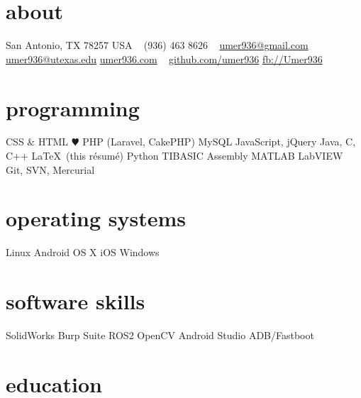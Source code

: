 \documentclass[]{friggeri-cv} %
\begin{document}


\begin{aside} %
	\section{about}
	San Antonio, TX 78257
	USA
	~
	(936) 463 8626
	~
	\href{mailto:umer936@gmail.com}{umer936@gmail.com}
	\href{mailto:umer936@utexas.edu}{umer936@utexas.edu}
	\href{http://umer936.com}{umer936.com}
	~
	\href{http://github.com/umer936}{github.com/umer936}
	\href{http://facebook.com/Umer936}{fb://Umer936}
	~
	\section{programming}
	CSS \& HTML
	{\color{red} $\varheartsuit$} PHP (Laravel, CakePHP)
	MySQL
	JavaScript, jQuery
	Java, C, C++
	\LaTeX \ (this r\'esum\'e)
	Python
	TIBASIC
	Assembly
	MATLAB
	LabVIEW
	Git, SVN, Mercurial
	~
	\section{operating systems}
	Linux
	Android
	OS X
	iOS
	Windows
	~
	\section{software skills}
	SolidWorks
	Burp Suite
	ROS2
	OpenCV
	Android Studio
	ADB/Fastboot
\end{aside}


\section{education}
\vspace{-10pt}
\end{document}
